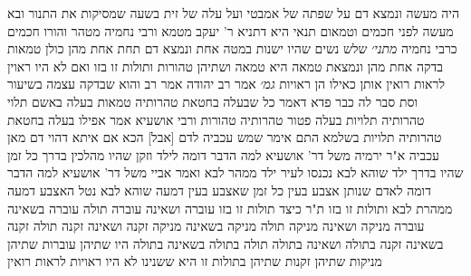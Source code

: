 \documentclass[12pt, openany]{book}
\begin{document}
{היה מעשה ונמצא דם על שפתה של אמבטי ועל עלה של זית בשעה שמסיקות את התנור ובא מעשה לפני חכמים וטמאום 
תנאי היא דתניא ר' יעקב מטמא ורבי נחמיה מטהר והורו חכמים כרבי נחמיה
{\large\emph{מתני׳}} שלש נשים שהיו ישנות במטה אחת ונמצא דם תחת אחת מהן כולן טמאות בדקה אחת מהן ונמצאת טמאה היא טמאה ושתיהן טהורות ותולות זו בזו ואם לא היו ראוין לראות רואין אותן כאילו הן ראויות
{\large\emph{גמ׳}} אמר רב יהודה אמר רב והוא שבדקה עצמה בשיעור וסת 
סבר לה כבר פדא דאמר כל שבעלה בחטאת טהרותיה טמאות
בעלה באשם תלוי טהרותיה תלויות בעלה פטור טהרותיה טהורות 
ורבי אושעיא אמר אפילו בעלה בחטאת טהרותיה תלויות 
בשלמא התם אימר שמש עכביה לדם [אבל] הכא אם איתא דהוי דם מאן עכביה 
א"ר ירמיה משל דר' אושעיא למה הדבר דומה לילד וזקן שהיו מהלכין בדרך כל זמן שהיו בדרך ילד שוהא לבא נכנסו לעיר ילד ממהר לבא ואמר אביי משל דר' אושעיא למה הדבר דומה לאדם שנותן אצבע בעין כל זמן שאצבע בעין דמעה שוהא לבא נטל האצבע דמעה ממהרת לבא
ותולות זו בזו ת"ר כיצד תולות זו בזו עוברה ושאינה עוברה תולה עוברה בשאינה עוברה
מניקה ושאינה מניקה תולה מניקה בשאינה מניקה זקנה ושאינה זקנה תולה זקנה בשאינה זקנה בתולה ושאינה בתולה תולה בתולה בשאינה בתולה 
היו שתיהן עוברות שתיהן מניקות שתיהן זקנות שתיהן בתולות זו היא ששנינו לא היו ראויות לראות רואין}
\end{document}
